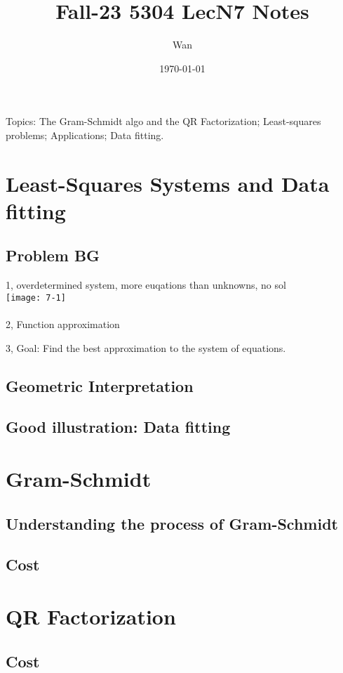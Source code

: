\documentclass{article}
\begin{document}
\title{Fall-23 5304 LecN7 Notes}
\author{Wan}
\date{\today}
\maketitle

\noindent
Topics: The Gram-Schmidt algo and the QR Factorization; Least-squares problems; Applications; Data fitting.

\section{Least-Squares Systems and Data fitting}
\subsection*{Problem BG}
1, overdetermined system, more euqations than unknowns, no sol\\
\texttt{[image: 7-1]}\\
\\
2, Function approximation

3, Goal: Find the best approximation to the system of equations.\\

\subsection*{Geometric Interpretation}

\subsection*{Good illustration: Data fitting}


\pagebreak
\section{Gram-Schmidt}

\subsection*{Understanding the process of Gram-Schmidt}

\subsection*{Cost}


\pagebreak
\section{QR Factorization}

\subsection*{Cost}
\end{document}

